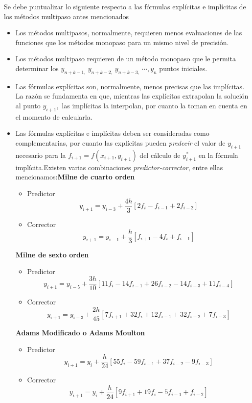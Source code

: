 \documentclass[spanish,titlepage,11pt]{article}
\begin{document}
Se debe puntualizar lo siguiente respecto a las f\'{o}rmulas expl\'{i}citas e
impl\'{i}citas de los m\'{e}todos multipaso antes mencionados

\begin{itemize}
\item  Los m\'{e}todos multipasos, normalmente, requieren menos evaluaciones
de las funciones que los m\'{e}todos monopaso para un mismo nivel de
precisi\'{o}n.

\item  Los m\'{e}todos multipaso requieren de un m\'{e}todo monopaso que le
permita determinar los $y_{n+k-1,}\ y_{n+k-2,}\ y_{n+k-3,}\ \cdots,y_{n}$
puntos iniciales.

\item  Las f\'{o}rmulas expl\'{i}citas son, normalmente, menos precisas que
las impl\'{i}citas. La raz\'{o}n se fundamenta en que, mientras las
expl\'{i}citas extrapolan la soluci\'{o}n al punto $y_{i+1},$ las
impl\'{i}citas la interpolan, por cuanto la toman en cuenta en el momento de calcularla.

\item  Las f\'{o}rmulas expl\'{i}citas e impl\'{i}citas deben ser consideradas
como complementarias, por cuanto las expl\'{i}citas pueden \textit{predecir}
el valor de $y_{i+1}$ necesario para la $f_{i+1}=f(x_{i+1},y_{i+1}) $ del
c\'{a}lculo de $y_{i+1}^{*}$ en la f\'{o}rmula impl\'{i}cita.\newline Existen
varias combinaciones \textit{predictor-corrector}, entre ellas
mencionamos:\newline \textbf{Milne de cuarto orden}

\begin{itemize}
\item  Predictor
\[
y_{i+1}=y_{i-3}+\frac{4h}{3}\left[  2f_{i}-f_{i-1}+2f_{i-2}\right]
\]

\item  Corrector
\[
y_{i+1}=y_{i-1}+\frac{h}{3}\left[  f_{i+1}-4f_{i}+f_{i-1}\right]
\]
\end{itemize}

\textbf{Milne de sexto orden}

\begin{itemize}
\item  Predictor
\[
y_{i+1}=y_{i-5}+\frac{3h}{10}\left[  11f_{i}-14f_{i-1}+26f_{i-2}%
-14f_{i-3}+11f_{i-4}\right]
\]

\item  Corrector
\[
y_{i+1}=y_{i-3}+\frac{2h}{45}\left[  7f_{i+1}+32f_{i}+12f_{i-1}+32f_{i-2}%
+7f_{i-3}\right]
\]
\end{itemize}

\textbf{Adams Modificado o Adams Moulton}

\begin{itemize}
\item  Predictor
\[
y_{i+1}=y_{i}+\frac{h}{24}\left[  55f_{i}-59f_{i-1}+37f_{i-2}-9f_{i-3}%
\right]
\]

\item  Corrector
\[
y_{i+1}=y_{i}+\frac{h}{24}\left[  9f_{i+1}+19f_{i}-5f_{i-1}+f_{i-2}\right]
\]
\end{itemize}
\end{itemize}
\end{document}
